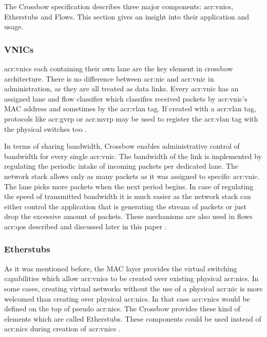 \documentclass[11pt]{book}
\begin{document}
        The Crossbow specification describes three major components: \gls{acr:vnic}s, Etherstubs and Flows. This section
        gives an insight into their application and usage.

                
        \subsubsection{VNICs}
        
          \gls{acr:vnic}s each containing their own lane are the key element in crossbow architecture. There is no
          difference between \gls{acr:nic} and \gls{acr:vnic} in administration, as they are all treated as data links.
          Every \gls{acr:vnic} has an assigned lane and flow classifier which classifies received packets by
          \gls{acr:vnic}'s MAC address and sometimes by the \gls{acr:vlan} tag.  If created with a \gls{acr:vlan} tag,
          protocols like \gls{acr:gvrp} or \gls{acr:mvrp} may be used to register the \gls{acr:vlan} tag with the
          physical switches too \cite{crossbow}.	

          In terms of sharing bandwidth, Crossbow enables administrative control of bandwidth for every single
          \gls{acr:vnic}. The bandwidth of the link is implemented by regulating the periodic intake of incoming packets
          per dedicated lane. The network stack allows only as many packets as it was assigned to specific
          \gls{acr:vnic}. The lane picks more packets when the next period begins. In case of regulating the speed of
          transmitted bandwidth it is much easier as the network stack can either control the application that is
          generating the stream of packets or just drop the excessive amount of packets. These mechanisms are also used
          in flows \gls{acr:qos} described and discussed later in this paper \cite{crossbow}.


        \subsubsection{Etherstubs}

          As it was mentioned before, the MAC layer provides the virtual switching capabilities which allow
          \gls{acr:vnic}s to be created over existing physical \gls{acr:nic}s.  In some cases, creating virtual networks
          without the use of a physical \gls{acr:nic} is more welcomed than creating over physical \gls{acr:nic}s. In
          that case \gls{acr:vnic}s would be defined on the top of pseudo \gls{acr:nic}s.  The Crossbow provides these
          kind of elements which are called Etherstubs. These components could be used instead of \gls{acr:nic}s during
          creation of \gls{acr:vnic}s \cite{crossbow}.
\end{document}
